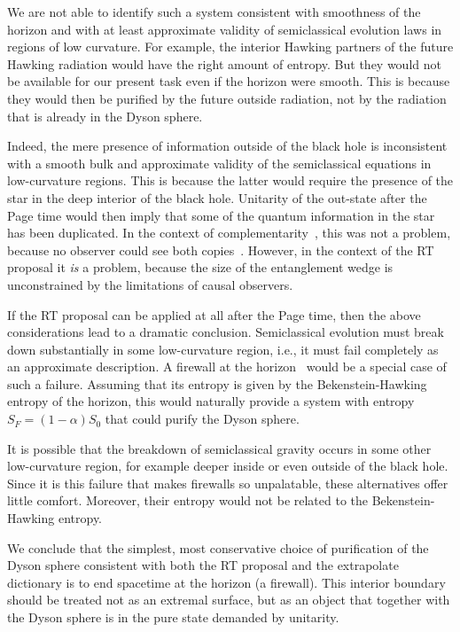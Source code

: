 \documentclass[12pt,letterpaper]{article}
\begin{document}
We are not able to identify such a system consistent with smoothness of the horizon and with at least approximate validity of semiclassical evolution laws in regions of low curvature. For example, the interior Hawking partners of the future Hawking radiation would have the right amount of entropy. But they would not be available for our present task even if the horizon were smooth. This is because they would then be purified by the future outside radiation, not by the radiation that is already in the Dyson sphere.

Indeed, the mere presence of information outside of the black hole is inconsistent with a smooth bulk and approximate validity of the semiclassical equations in low-curvature regions. This is because the latter would require the presence of the star in the deep interior of the black hole. Unitarity of the out-state after the Page time would then imply that some of the quantum information in the star has been duplicated. In the context of complementarity~\cite{SusTho93}, this was not a problem, because no observer could see both copies~\cite{SusTho93b}. However, in the context of the RT proposal it {\em is\/} a problem, because the size of the entanglement wedge is unconstrained by the limitations of causal observers.  

If the RT proposal can be applied at all after the Page time, then the above considerations lead to a dramatic conclusion. Semiclassical evolution must break down substantially in some low-curvature region, i.e., it must fail completely as an approximate description. A firewall at the horizon~\cite{AMPS} would be a special case of such a failure. Assuming that its entropy is given by the Bekenstein-Hawking entropy of the horizon, this would naturally provide a system with entropy $S_F=(1-\alpha) S_0$ that could purify the Dyson sphere.

It is possible that the breakdown of semiclassical gravity occurs in some other low-curvature region, for example deeper inside or even outside of the black hole. Since it is this failure that makes firewalls so unpalatable, these alternatives offer little comfort. Moreover, their entropy would not be related to the Bekenstein-Hawking entropy.

We conclude that the simplest, most conservative choice of purification of the Dyson sphere consistent with both the RT proposal and the extrapolate dictionary is to end spacetime at the horizon (a firewall). This interior boundary should be treated not as an extremal surface, but as an object that together with the Dyson sphere is in the pure state demanded by unitarity.
\end{document}

